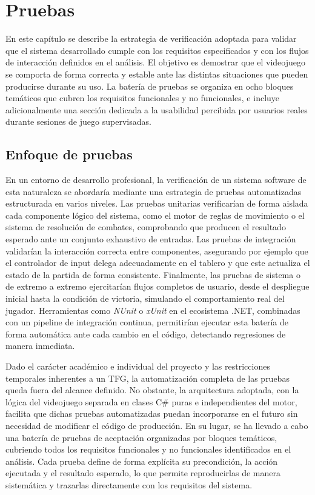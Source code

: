 \chapter{Pruebas}

En este capítulo se describe la estrategia de verificación adoptada para validar que el sistema desarrollado cumple con los requisitos especificados y con los flujos de interacción definidos en el análisis. El objetivo es demostrar que el videojuego se comporta de forma correcta y estable ante las distintas situaciones que pueden producirse durante su uso. La batería de pruebas se organiza en ocho bloques temáticos que cubren los requisitos funcionales y no funcionales, e incluye adicionalmente una sección dedicada a la usabilidad percibida por usuarios reales durante sesiones de juego supervisadas.

\section{Enfoque de pruebas}

En un entorno de desarrollo profesional, la verificación de un sistema software de esta naturaleza se abordaría mediante una estrategia de pruebas automatizadas estructurada en varios niveles. Las pruebas unitarias verificarían de forma aislada cada componente lógico del sistema, como el motor de reglas de movimiento o el sistema de resolución de combates, comprobando que producen el resultado esperado ante un conjunto exhaustivo de entradas. Las pruebas de integración validarían la interacción correcta entre componentes, asegurando por ejemplo que el controlador de input delega adecuadamente en el tablero y que este actualiza el estado de la partida de forma consistente. Finalmente, las pruebas de sistema o de extremo a extremo ejercitarían flujos completos de usuario, desde el despliegue inicial hasta la condición de victoria, simulando el comportamiento real del jugador. Herramientas como \textit{NUnit} o \textit{xUnit} en el ecosistema .NET, combinadas con un pipeline de integración continua, permitirían ejecutar esta batería de forma automática ante cada cambio en el código, detectando regresiones de manera inmediata.

\clearpage

Dado el carácter académico e individual del proyecto y las restricciones temporales inherentes a un TFG, la automatización completa de las pruebas queda fuera del alcance definido. No obstante, la arquitectura adoptada, con la lógica del videojuego separada en clases C\# puras e independientes del motor, facilita que dichas pruebas automatizadas puedan incorporarse en el futuro sin necesidad de modificar el código de producción. En su lugar, se ha llevado a cabo una batería de pruebas de aceptación organizadas por bloques temáticos, cubriendo todos los requisitos funcionales y no funcionales identificados en el análisis. Cada prueba define de forma explícita su precondición, la acción ejecutada y el resultado esperado, lo que permite reproducirlas de manera sistemática y trazarlas directamente con los requisitos del sistema.

